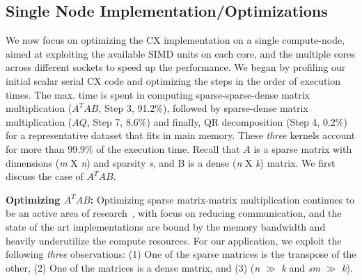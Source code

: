 \subsection {Single Node Implementation/Optimizations}
\label{sxn:single_node_opt}

    We now focus on optimizing the CX implementation on a single
    compute-node, aimed at exploiting the available SIMD units on each
    core, and the multiple cores across different sockets to speed up the performance. 
    We began by profiling our initial %
    scalar serial CX
    code and optimizing the steps in the order of execution times.
    The max. time is spent in computing sparse-sparse-dense matrix
    multiplication ($A^TAB$, Step 3, 91.2\%), followed by  sparse-dense matrix
    multiplication ($AQ$, Step 7, 8.6\%) and finally, QR
    decomposition (Step 4, 0.2\%)
    for a representative dataset that fits in main memory. These
    {\it{three}} kernels account for more than 99.9\% of
    the execution time.
    Recall that $A$ is a sparse matrix with dimensions ({\it{m}} X
    {\it{n}}) and sparsity {\it{s}}, and B is a dense ({\it{n}} X {\it{k}}) matrix.
    We first discuss the case of $A^TAB$.

\vspace*{0.1in} 
{\bf{{ {Optimizing $A^TAB$:}}}}
    Optimizing sparse matrix-matrix  multiplication continues to be an
    active area of research~\cite{ballard13,patwary15}, with focus on
    reducing communication, and the state of the art implementations
    are bound by the memory bandwidth and heavily
    underutilize the compute resources. 
    For our application, we exploit the following {\it{three}} observations:
    (1) One of the sparse matrices is the transpose of the other,   
    (2) One of the matrices is a dense matrix,   and    %
    (3) ({\it{n}} $\gg$  {\it{k}} and  {\it{sm}} $\gg$ {\it{k}}).

